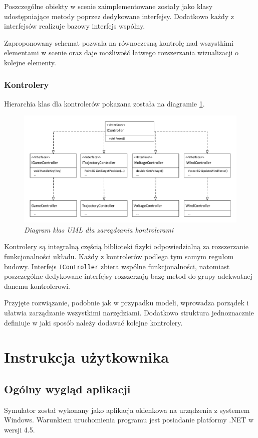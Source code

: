 \documentclass[12pt, oneside]{report}
\theoremstyle{definition}
\begin{document}
Poszczególne obiekty w scenie zaimplementowane zostały jako klasy udostępniające metody poprzez dedykowane interfejsy. Dodatkowo każdy z interfejsów realizuje bazowy interfejs wspólny. 

Zaproponowany schemat pozwala na równoczesną kontrolę nad wszystkimi elementami w scenie oraz daje możliwość łatwego rozszerzania wizualizacji o kolejne elementy.

\subsection{Kontrolery}
Hierarchia klas dla kontrolerów pokazana została na diagramie \ref{IController}.  

\begin{figure}[H]
	\centering
		\includegraphics[width = 400pt]{IController} 
		\caption{\textit{Diagram klas UML dla zarządzania kontrolerami}}
		\label{IController}
\end{figure}

Kontrolery są integralną częścią biblioteki fizyki odpowiedzialną za rozszerzanie funkcjonalności układu. Każdy z kontrolerów podlega tym samym regułom budowy. Interfejs \texttt{IController} zbiera wspólne funkcjonalności, natomiast poszczególne dedykowane interfejsy rozszerzają bazę metod do grupy adekwatnej danemu kontrolerowi. 

Przyjęte rozwiązanie, podobnie jak w przypadku modeli, wprowadza porządek i ułatwia zarządzanie wszystkimi narzędziami. Dodatkowo struktura jednoznacznie definiuje w jaki sposób należy dodawać kolejne kontrolery.

\chapter{Instrukcja użytkownika}
\section{Ogólny wygląd aplikacji}
Symulator został wykonany jako aplikacja okienkowa na urządzenia z systemem Windows. Warunkiem uruchomienia programu jest posiadanie platformy .NET w wersji 4.5. 
\end{document}

